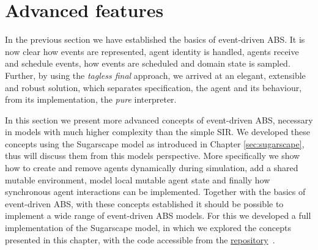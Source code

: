 \section{Advanced features}
\label{sec:advanced_eventdriven_ABS}

In the previous section we have established the basics of event-driven ABS. It is now clear how events are represented, agent identity is handled, agents receive and schedule events, how events are scheduled and domain state is sampled. Further, by using the \textit{tagless final} approach, we arrived at an elegant, extensible and robust solution, which separates specification, the agent and its behaviour, from its implementation, the \textit{pure} interpreter. 

In this section we present more advanced concepts of event-driven ABS, necessary in models with much higher complexity than the simple SIR. We developed these concepts using the Sugarscape model as introduced in Chapter \ref{sec:sugarscape}, thus will discuss them from this models perspective. More specifically we show how to create and remove agents dynamically during simulation, add a shared mutable environment, model local mutable agent state and finally how synchronous agent interactions can be implemented. Together with the basics of event-driven ABS, with these concepts established it should be possible to implement a wide range of event-driven ABS models. For this we developed a full implementation of the Sugarscape model, in which we explored the concepts presented in this chapter, with the code accessible from the \href{https://github.com/thalerjonathan/haskell-sugarscape}{repository}~\cite{thaler_sugarscape_repository}.










